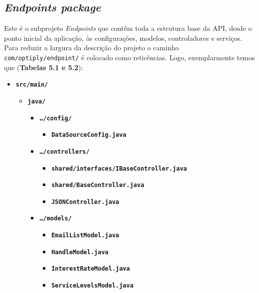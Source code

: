 \newpage

\subsection{\textit{\textit{Endpoints} package}}\label{endp}

Este é o subprojeto \textit{Endpoints} que contêm toda a estrutura base da API, desde o ponto inicial da aplicação, às configurações, modelos, controladores e serviços. Para reduzir a largura da descrição do projeto o caminho \texttt{com/optiply/endpoint/} é colocado como reticências. Logo, exemplarmente temos que (\textbf{Tabelas 5.1 e 5.2}):

\begin{table}[!hbt]
  \begin{itemize}
    \item \texttt{\textbf{src/main/}}\begin{itemize}
            \item \texttt{\textbf{java/}}\begin{itemize}
                    \item \texttt{\textbf{\ldots/config/}}\begin{itemize}
                            \item \texttt{\textbf{DataSourceConfig.java}}
                          \end{itemize}
                    \item \texttt{\textbf{\ldots/controllers/}}\begin{itemize}
                            \item \texttt{\textbf{shared/interfaces/IBaseController.java}}
                            \item \texttt{\textbf{shared/BaseController.java}}
                            \item \texttt{\textbf{JSONController.java}}
                          \end{itemize}
                    \item \texttt{\textbf{\ldots/models/}}\begin{itemize}
                            \item \texttt{\textbf{EmailListModel.java}}
                            \item \texttt{\textbf{HandleModel.java}}
                            \item \texttt{\textbf{InterestRateModel.java}}
                            \item \texttt{\textbf{ServiceLevelsModel.java}}

\end{itemize}
\end{itemize}
\end{itemize}
\end{itemize}
\end{table}
